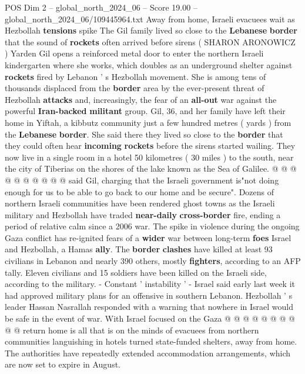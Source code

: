 \begin{textsample}{POS Dim 2 – global\_north\_2024\_06 – Score 19.00 – global\_north\_2024\_06/109445964.txt}  \label{ex:f2_pos_319}
Away from home, Israeli evacuees wait as Hezbollah \textbf{tensions} spike The Gil family lived so close to the \textbf{Lebanese} \textbf{border} that the sound of \textbf{rockets} often arrived before sirens ( SHARON ARONOWICZ ) Yarden Gil opens a reinforced metal door to enter the northern Israeli kindergarten where she works, which doubles as an underground shelter against \textbf{rockets} fired by Lebanon ' s Hezbollah movement.
She is among tens of thousands displaced from the \textbf{border} area by the ever-present threat of Hezbollah \textbf{attacks} and, increasingly, the fear of an \textbf{all-out} war against the powerful \textbf{Iran-backed} \textbf{militant} group.
Gil, 36, and her family have left their home in Yiftah, a kibbutz community just a few hundred metres ( yards ) from the \textbf{Lebanese} \textbf{border}.
She said there they lived so close to the \textbf{border} that they could often hear \textbf{incoming} \textbf{rockets} before the sirens started wailing.
They now live in a single room in a hotel 50 kilometres ( 30 miles ) to the south, near the city of Tiberias on the shores of the lake known as the Sea of Galilee. @ @ @ @ @ @ @ @ @ @ said Gil, charging that the Israeli government is"not doing enough for us to be able to go back to our home and be secure".
Dozens of northern Israeli communities have been rendered ghost towns as the Israeli military and Hezbollah have traded \textbf{near-daily} \textbf{cross-border} fire, ending a period of relative calm since a 2006 war.
The spike in violence during the ongoing Gaza conflict has re-ignited fears of a \textbf{wider} war between long-term \textbf{foes} Israel and Hezbollah, a Hamas \textbf{ally}.
The \textbf{border} \textbf{clashes} have killed at least 93 civilians in Lebanon and nearly 390 others, mostly \textbf{fighters}, according to an AFP tally.
Eleven civilians and 15 soldiers have been killed on the Israeli side, according to the military. - Constant ' instability ' - Israel said early last week it had approved military plans for an offensive in southern Lebanon.
Hezbollah ' s leader Hassan Nasrallah responded with a warning that nowhere in Israel would be safe in the event of war.
With Israel focused on the Gaza @ @ @ @ @ @ @ @ @ @ return home is all that is on the minds of evacuees from northern communities languishing in hotels turned state-funded shelters, away from home.
The authorities have repeatedly extended accommodation arrangements, which are now set to expire in August.

\end{textsample}
